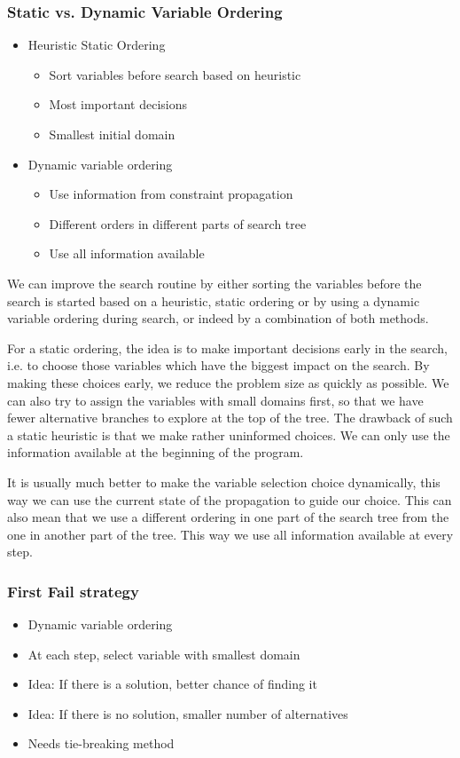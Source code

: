 \begin{frame}
\frametitle{Static vs. Dynamic Variable Ordering}
\begin{itemize}
\item Heuristic Static Ordering
\begin{itemize}
\item Sort variables before search based on heuristic
\item Most important decisions
\item Smallest initial domain
\end{itemize} 
\item Dynamic variable ordering
\begin{itemize}
\item Use information from constraint propagation
\item Different orders in different parts of search tree
\item Use all information available
\end{itemize}
\end{itemize}
\end{frame}

We can improve the search routine by either sorting the variables before the search is started based on a heuristic, static ordering or by using a dynamic variable ordering during search, or indeed by a combination of both methods.

For a static ordering, the idea is to make important decisions early in the search, i.e. to choose those variables which have the biggest impact on the search. By making these choices early, we reduce the problem size as quickly as possible. We can also try to assign the variables with small domains first, so that we have fewer alternative branches to explore at the top of the tree. The drawback of such a static heuristic is that we make rather uninformed choices. We can only use the information available at the beginning of the program.

It is usually much better to make the variable selection choice dynamically, this way we can use the current state of the propagation to guide our choice. This can also mean that we use a different ordering in one part of the search tree from the one in another part of the tree. This way we use all information available at every step.

\begin{frame}
\frametitle{First Fail strategy}
\begin{itemize}
\item Dynamic variable ordering
\item At each step, select variable with smallest domain
\item Idea: If there is a solution, better chance of finding it
\item Idea: If there is no solution, smaller number of alternatives
\item Needs tie-breaking method
\end{itemize}
\end{frame}

